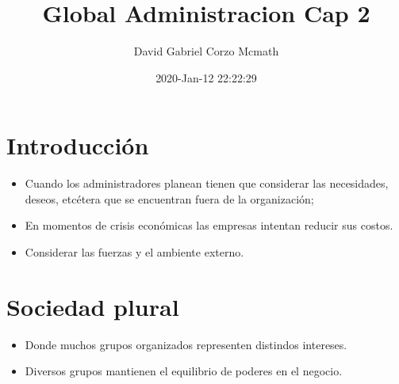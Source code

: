 \documentclass{book}
\title{Global Administracion Cap 2}
\author{David Gabriel Corzo Mcmath}
\date{2020-Jan-12 22:22:29}
\begin{document}
\maketitle
\tableofcontents

\section{Introducción}
\begin{itemize}
    \item Cuando los administradores planean tienen que considerar las necesidades, deseos, etcétera que se encuentran fuera de la organización; 
    \item En momentos de crisis económicas las empresas intentan reducir sus costos.
    \item Considerar las fuerzas y el ambiente externo.
\end{itemize}

\section{Sociedad plural}
\begin{itemize}
    \item Donde muchos grupos organizados representen distindos intereses.
    \item Diversos grupos mantienen el equilibrio de poderes en el negocio.
\end{itemize}
\end{document}
